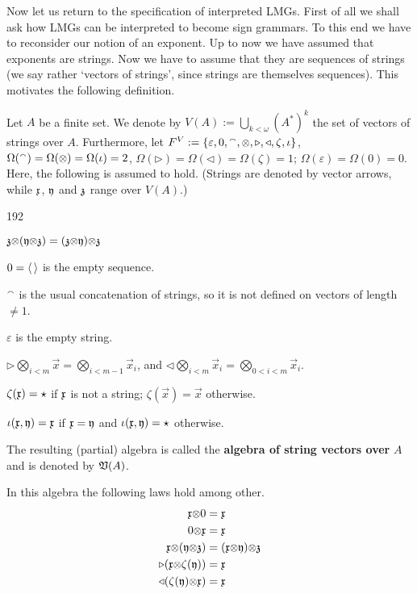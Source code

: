 Now let us return to the specification of interpreted LMGs.
First of all we shall ask how LMGs can be interpreted to
become sign grammars. To this end we have to reconsider our
notion of an exponent. Up to now we have assumed that exponents
are strings. Now we have to assume that they are sequences of
strings (we say rather `vectors of strings', since strings are
themselves sequences). This motivates the following definition.
\begin{defn}
Let $A$ be a finite set. We denote by $V(A) := \bigcup_{k < \omega} 
(A^{\ast})^k$ the set of vectors of strings over $A$. Furthermore, 
let $F^{V} := \{\varepsilon, 0, {^{\smallfrown}}, \mbox{\small$\otimes$}, \triangleright, 
\triangleleft, \zeta, \iota\}$, 
\index{$\sotimes$, $\triangleleft$, $\triangleright$, $\zeta$, $\iota$}%
$\Omega({^{\smallfrown}}) = \Omega(\mbox{\small$\otimes$}) =
\Omega(\iota) = 2$, $\Omega(\triangleright) = \Omega(\triangleleft) =
\Omega(\zeta) = 1$; $\Omega(\varepsilon) = \Omega(0) = 0$. Here, the
following is assumed to hold. (Strings are denoted 
by vector arrows, while $\mathfrak{x}$, $\mathfrak{y}$ and $\mathfrak{z}$ range over $V(A)$.)
\begin{dingautolist}{192}
\item
$\mathfrak{z} \mbox{\small$\otimes$} (\mathfrak{y} \mbox{\small$\otimes$} \mathfrak{z}) = (\mathfrak{z} \mbox{\small$\otimes$} \mathfrak{y}) \mbox{\small$\otimes$} \mathfrak{z}$
\item
$0 = \langle\,\rangle$ is the empty sequence.
\item
${^{\smallfrown}}$ is the usual concatenation of strings, so it is not defined
on vectors of length $\neq 1$.
\item
$\varepsilon$ is the empty string.
\item
$\triangleright \bigotimes_{i< m} \vec{x} =
\bigotimes_{i < m-1} \vec{x}_i$, and $\triangleleft \bigotimes_{i < m}
\vec{x}_i = \bigotimes_{0 < i < m} \vec{x}_i$.
\item
$\zeta(\mathfrak{x}) = \star$ if $\mathfrak{x}$ is not a string;
$\zeta(\vec{x}) = \vec{x}$ otherwise.
\item
$\iota(\mathfrak{x},\mathfrak{y}) = \mathfrak{x}$ if $\mathfrak{x} = \mathfrak{y}$ and
$\iota(\mathfrak{x}, \mathfrak{y}) = \star$ otherwise.
\end{dingautolist}
The resulting (partial)
algebra is called the \textbf{algebra of string vectors over} $A$ 
and is denoted by $\mathfrak{V}(A)$.
\index{$\GV(\GA)$}%
\end{defn}
In this algebra the following laws hold among other.
\begin{equation}
\begin{split}
\mathfrak{x} \mbox{\small$\otimes$} 0 & = \mathfrak{x} \\
0 \mbox{\small$\otimes$} \mathfrak{x} & = \mathfrak{x} \\
\mathfrak{x} \mbox{\small$\otimes$} (\mathfrak{y} \mbox{\small$\otimes$} \mathfrak{z}) & = (\mathfrak{x} \mbox{\small$\otimes$} \mathfrak{y}) \mbox{\small$\otimes$} \mathfrak{z} \\
\triangleright (\mathfrak{x} \mbox{\small$\otimes$} \zeta (\mathfrak{y})) & = \mathfrak{x} \\
\triangleleft (\zeta (\mathfrak{y}) \mbox{\small$\otimes$} \mathfrak{x}) & = \mathfrak{x}
\end{split}
\end{equation}
